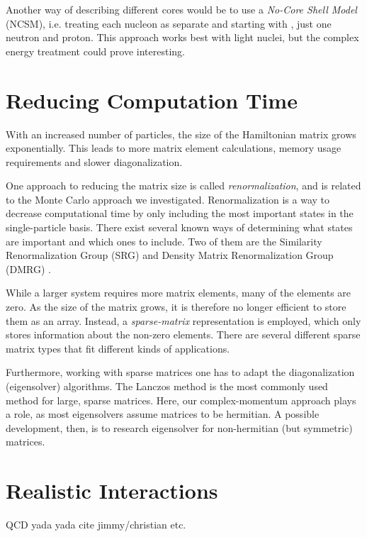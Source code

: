 \documentclass[../main/report.tex]{subfiles}
\begin{document}
Another way of describing different cores would be to use a \emph{No-Core Shell Model} (NCSM), i.e. treating each nucleon as separate and starting with , just one neutron and proton. This approach works best with light nuclei, but the complex energy treatment could prove interesting.

\section{Reducing Computation Time}

With an increased number of particles, the size of the Hamiltonian matrix grows exponentially. This leads to more matrix element calculations, memory usage requirements and slower diagonalization.

One approach to reducing the matrix size is called \emph{renormalization}, and is related to the Monte Carlo approach we investigated. 
Renormalization is a way to decrease computational time by only including the most important states in the single-particle basis.
There exist several known ways of determining what states are important and which ones to include. Two of them are the Similarity Renormalization Group (SRG) and Density Matrix Renormalization Group (DMRG) \cite{DMRG}. 

While a larger system requires more matrix elements, many of the elements are zero. 
As the size of the matrix grows, it is therefore no longer efficient to store them as an array. 
Instead, a \emph{sparse-matrix} representation is employed, which only stores information about the non-zero elements. 
There are several different sparse matrix types that fit different kinds of applications. 

Furthermore, working with sparse matrices one has to adapt the diagonalization (eigensolver) algorithms. 
The Lanczos method is the most commonly used method for large, sparse matrices.
Here, our complex-momentum approach plays a role, as most eigensolvers assume matrices to be hermitian.
A possible development, then, is to research eigensolver for non-hermitian (but symmetric) matrices.

\section{Realistic Interactions}

QCD yada yada cite jimmy/christian etc.
\end{document}
